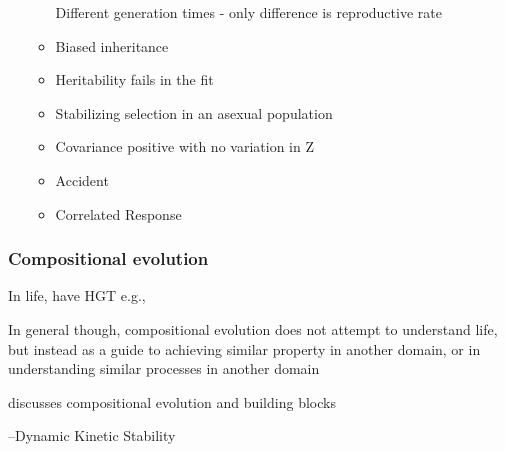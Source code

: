 \begin{itemize}
\begin{itemize}
		Different generation times - only difference is reproductive rate
		
		\item
		
		Biased inheritance
		
		\item
		
		Heritability fails in the fit
		
		\item
		
		Stabilizing selection in an asexual population
		
		\item
		
		Covariance positive with no variation in Z
		
		\item
		
		Accident
		
		\item
		
		Correlated Response
		
	\end{itemize}
\end{itemize}

\subsubsection{Compositional evolution}

In life, have HGT e.g., \autocite{Ochman2000}

In general though, compositional evolution does not attempt to understand life, but instead as a guide to achieving similar property in another domain, or in understanding similar processes in another domain \autocite{Arthur2009}

\autocite{Watson2002} discusses compositional evolution and building blocks

\autocite{Pross2011}--Dynamic Kinetic Stability

